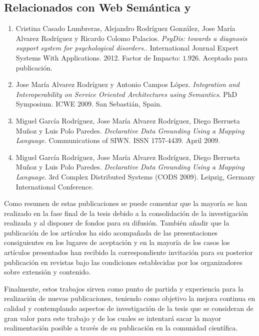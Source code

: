 \subsection{Relacionados con Web Semántica y \linkeddata}

\begin{enumerate}

\item Cristina Casado Lumbreras, Alejandro Rodríguez González, Jose María Alvarez Rodríguez y Ricardo Colomo Palacios. 
\textit{PsyDis: towards a diagnosis support system for psychological disorders.}. International Journal Expert Systems With Applications. 2012. 
Factor de Impacto: $1.926$. Aceptado para publicación.

\item Jose María Alvarez Rodríguez y Antonio Campos López. 
\textit{Integration and Interoperability on Service Oriented Architectures using Semantics}. PhD Symposium. ICWE 2009.
San Sebastián, Spain.

\item Miguel García Rodríguez, Jose María Alvarez Rodríguez, Diego Berrueta Muñoz y Luis Polo Paredes. 
\textit{Declarative Data Grounding Using a Mapping Language}. Communications of SIWN. ISSN 1757-4439. April 2009.


\item Miguel García Rodríguez, Jose María Alvarez Rodríguez, Diego Berrueta Muñoz y Luis Polo Paredes. 
\textit{Declarative Data Grounding Using a Mapping Language}. 3rd Complex Distributed Systems (CODS 2009). Leipzig, Germany International Conference.

\end{enumerate}

Como resumen de estas publicaciones se puede comentar que la mayoría se han realizado en la fase final
de la tesis debido a la consolidación de la investigación realizada y al disponer de fondos para su
difusión. También añadir que la publicación de los artículos ha sido acompañada de las presentaciones
consiguientes en los lugares de aceptación y en la mayoría de los casos los artículos presentados
han recibido la correspondiente invitación para su posterior publicación en revistas bajo las condiciones
establecidas por los organizadores sobre extensión y contenido.

Finalmente, estos trabajos sirven como punto de partida y experiencia para la realización de nuevas publicaciones, teniendo
como objetivo la mejora continua en calidad y contemplando aspectos de investigación de la tesis que se 
consideran de gran valor para este trabajo y de los cuales se intentará sacar la mayor realimentación posible a 
través de su publicación en la comunidad científica.


